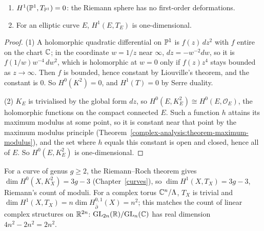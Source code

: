\begin{proposition}\label{deformations:proposition-curves-deformations}
\begin{enumerate}
\item $H^1(\mathbb{P}^1, T_{\mathbb{P}^1}) = 0$: the Riemann sphere has no first-order deformations.
\item For an elliptic curve $E$, $H^1(E, T_E)$ is one-dimensional.
\end{enumerate}
\end{proposition}

\begin{proof}
(1) A holomorphic quadratic differential on $\mathbb{P}^1$ is $f(z)\,dz^2$ with $f$ entire on the chart $\mathbb{C}$; in the coordinate $w = 1/z$ near $\infty$, $dz = -w^{-2}dw$, so it is $f(1/w)w^{-4}\,dw^2$, which is holomorphic at
$w = 0$ only if $f(z)z^4$ stays bounded as $z \to \infty$. Then $f$ is bounded, hence constant by Liouville's theorem, and the constant is $0$. So $H^0(K^2) = 0$, and $H^1(T) = 0$ by Serre duality.

(2) $K_E$ is trivialised by the global form $dz$, so $H^0(E, K_E^2) \cong H^0(E, \mathcal{O}_E)$, the holomorphic functions on the compact connected $E$. Such a function $h$ attains its maximum modulus at some point, so it is constant near that point by the maximum modulus principle
(Theorem~\ref{complex-analysis:theorem-maximum-modulus}), and the set where $h$ equals this constant is open and closed, hence all of $E$. So $H^0(E, K_E^2)$ is one-dimensional.
\end{proof}

For a curve of genus $g \geq 2$, the Riemann--Roch theorem gives $\dim H^0(X, K_X^2) = 3g - 3$ (Chapter~\ref{curves}), so $\dim H^1(X, T_X) = 3g - 3$, Riemann's count of moduli. For a complex torus $\mathbb{C}^n/\Lambda$,
$T_X$ is trivial and $\dim H^1(X, T_X) = n\dim H^{0,1}_{\bar\partial}(X) = n^2$; this matches the count of linear complex structures on $\mathbb{R}^{2n}$: $\mathrm{GL}_{2n}(\mathbb{R})/\mathrm{GL}_n(\mathbb{C})$ has real dimension $4n^2 - 2n^2 = 2n^2$.

